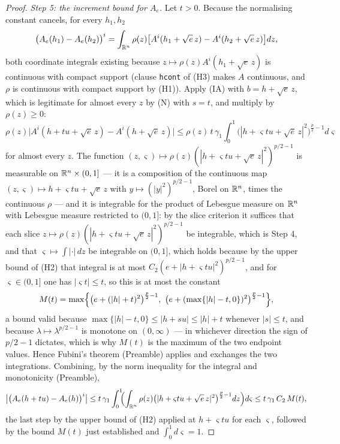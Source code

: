 \begin{proof}
\emph{Step 5: the increment bound for $A_e$.}  Let $t>0$.  Because the
normalising constant cancels, for every $h_1,h_2$
\[
\bigl(A_e(h_1)-A_e(h_2)\bigr)^i
=\int_{\mathbb{R}^n}\rho(z)\bigl[A^i(h_1+\sqrt e\,z)-A^i(h_2+\sqrt e\,z)\bigr]dz ,
\]
both coordinate integrals existing because $z\mapsto\rho(z)A^i(h_1+\sqrt e\,z)$
is continuous with compact support (clause \texttt{hcont} of (H3) makes $A$
continuous, and $\rho$ is continuous with compact support by (H1)).  Apply (IA)
with $b=h+\sqrt e\,z$, which is legitimate for almost every $z$ by (N) with
$s=t$, and multiply by $\rho(z)\ge0$:
\[
\rho(z)\bigl|A^i(h+tu+\sqrt e\,z)-A^i(h+\sqrt e\,z)\bigr|
\le\rho(z)\,t\,\gamma_1\int_0^1\bigl(|h+\varsigma tu+\sqrt e\,z|^2\bigr)^{\frac p2-1}d\varsigma
\]
for almost every $z$.  The function
$(z,\varsigma)\mapsto\rho(z)(|h+\varsigma tu+\sqrt e\,z|^2)^{p/2-1}$ is
measurable on $\mathbb{R}^n\times(0,1]$ --- it is a composition of the continuous map
$(z,\varsigma)\mapsto h+\varsigma tu+\sqrt e\,z$ with
$y\mapsto(|y|^2)^{p/2-1}$, Borel on $\mathbb{R}^n$, times the continuous $\rho$ --- and
it is integrable for the product of Lebesgue measure on $\mathbb{R}^n$ with Lebesgue
measure restricted to $(0,1]$: by the slice criterion it suffices that each
slice $z\mapsto\rho(z)(|h+\varsigma tu+\sqrt e\,z|^2)^{p/2-1}$ be integrable,
which is Step 4, and that $\varsigma\mapsto\int|\cdot|\,dz$ be integrable on
$(0,1]$, which holds because by the upper bound of (H2) that integral is at most
$C_2(e+|h+\varsigma tu|^2)^{p/2-1}$, and for $\varsigma\in(0,1]$ one has
$|\varsigma t|\le t$, so this is at most the constant
\[
M(t)=\max\Bigl\{\bigl(e+(|h|+t)^2\bigr)^{\frac p2-1},\
\bigl(e+(\max\{|h|-t,0\})^2\bigr)^{\frac p2-1}\Bigr\} ,
\]
a bound valid because $\max\{|h|-t,0\}\le|h+su|\le|h|+t$ whenever $|s|\le t$,
and because $\lambda\mapsto\lambda^{p/2-1}$ is monotone on $(0,\infty)$ --- in
whichever direction the sign of $p/2-1$ dictates, which is why $M(t)$ is the
maximum of the two endpoint values.  Hence Fubini's theorem (Preamble) applies
and exchanges the two integrations.  Combining, by the norm inequality for the
integral and monotonicity (Preamble),
\[
\bigl|\bigl(A_e(h+tu)-A_e(h)\bigr)^i\bigr|
\le t\,\gamma_1\int_0^1\!\!\Bigl(\int_{\mathbb{R}^n}\rho(z)
   \bigl(|h+\varsigma tu+\sqrt e\,z|^2\bigr)^{\frac p2-1}dz\Bigr)d\varsigma
\le t\,\gamma_1\,C_2\,M(t),
\]
the last step by the upper bound of (H2) applied at $h+\varsigma tu$ for each
$\varsigma$, followed by the bound $M(t)$ just established and
$\int_0^1d\varsigma=1$.


\end{proof}
